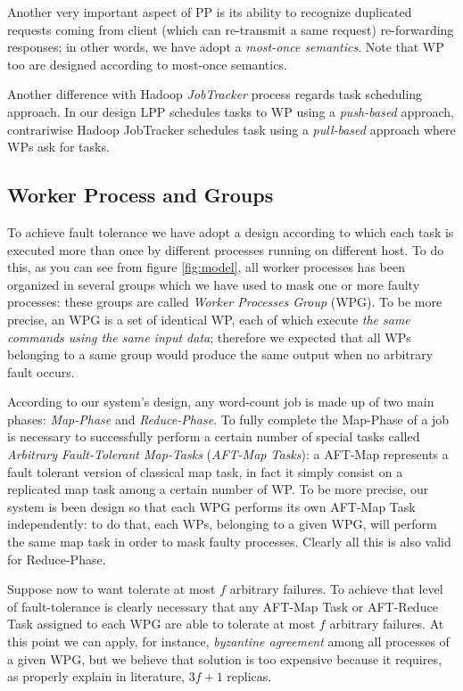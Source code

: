 \documentclass[sigchi]{acmart}
\begin{document}
Another very important aspect of PP is its ability to recognize duplicated requests coming from client (which can re-transmit a same request) re-forwarding responses; in other words, we have adopt a \textit{most-once semantics}. Note that WP too are designed according to most-once semantics.

Another difference with Hadoop \textit{JobTracker} process regards task scheduling approach. In our design LPP schedules tasks to WP using a \textit{push-based} approach, contrariwise Hadoop JobTracker schedules task using a \textit{pull-based} approach where WPs ask for tasks\cite{LARTS}.

\subsection{Worker Process and Groups}

To achieve fault tolerance we have adopt a design according to which each task is executed more than once by different processes running on different host. To do this, as you can see from figure \ref{fig:model}, all worker processes has been organized in several groups which we have used to mask one or more faulty processes: these groups are called \textit{Worker Processes Group} (WPG). To be more precise, an WPG is a set of identical WP, each of which execute \textit{the same commands using the same input data}; therefore we expected that all WPs belonging to a same group would produce the same output when no arbitrary fault occurs. 

According to our system's design, any word-count job is made up of two main phases: \textit{Map-Phase} and \textit{Reduce-Phase}. To fully complete the Map-Phase of a job is necessary to successfully perform a certain number of special tasks called \textit{Arbitrary Fault-Tolerant Map-Tasks} (\textit{AFT-Map Tasks}): a AFT-Map represents a fault tolerant version of classical map task, in fact it simply consist on a replicated map task among a certain number of WP. To be more precise, our system is been design so that each WPG performs its own AFT-Map Task independently: to do that, each WPs, belonging to a given WPG, will perform the same map task in order to mask faulty processes. Clearly all this is also valid for Reduce-Phase.

Suppose now to want tolerate at most $f$ arbitrary failures. To achieve that level of fault-tolerance is clearly necessary that any AFT-Map Task or AFT-Reduce Task assigned to each WPG are able to tolerate at most $f$ arbitrary failures. At this point we can apply, for instance, \textit{byzantine agreement} among all processes of a given WPG, but we believe that solution is too expensive because it requires, as properly explain in literature\citep{SDCC}, $3f + 1$ replicas.
\end{document}
